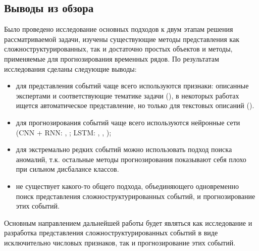 \subsection{Выводы из обзора}
Было проведено исследование основных подходов к двум этапам решения рассматриваемой задачи, изучены существующие методы представления как сложноструктурированных, так и достаточно простых объектов и методы, применяемые для прогнозирования временных рядов. По результатам исследования сделаны следующие выводы:
\begin{itemize}
    \item для представления событий чаще всего используются признаки: описанные экспертами и соответствующие тематике задачи (\cite{twitter_predicting}), в некоторых работах ищется автоматическое представление, но только для текстовых описаний (\cite{struct_unstruct_prediction}).
    \item для прогнозирования событий чаще всего используются нейронные сети (CNN + RNN: \cite{traffic_flow_forecasting}, \cite{modeling_patterns_with_DNN}; LSTM: \cite{uber_mulitvar_forecasting}, \cite{predictive_monitoring_LSTM}, \cite{struct_unstruct_prediction});
    \item для экстремально редких событий можно использовать подход поиска аномалий, т.к. остальные методы прогнозирования показывают себя плохо при сильном дисбалансе классов.
    \item не существует какого-то общего подхода, объединяющего одновременно поиск представления сложноструктурированных событий, и прогнозирование этих событий.
\end{itemize}

Основным направлением дальнейшей работы будет являться как исследование и разработка представления сложноструктурированных событий в виде исключительно числовых признаков, так и прогнозирование этих событий.
